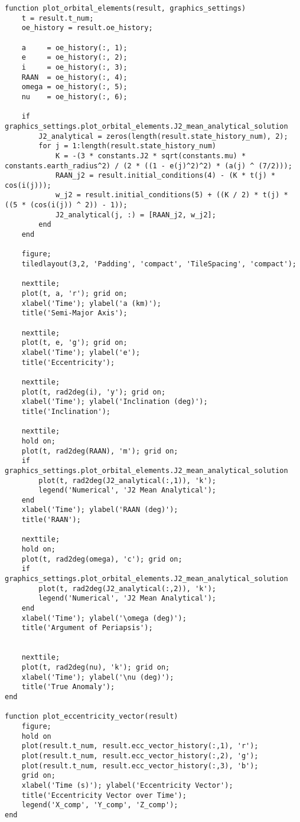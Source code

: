 \begin{lstlisting}
function plot_orbital_elements(result, graphics_settings)
    t = result.t_num;
    oe_history = result.oe_history;

    a     = oe_history(:, 1);
    e     = oe_history(:, 2);
    i     = oe_history(:, 3);
    RAAN  = oe_history(:, 4);  
    omega = oe_history(:, 5);
    nu    = oe_history(:, 6);  

    if graphics_settings.plot_orbital_elements.J2_mean_analytical_solution
        J2_analytical = zeros(length(result.state_history_num), 2);
        for j = 1:length(result.state_history_num)
            K = -(3 * constants.J2 * sqrt(constants.mu) * constants.earth_radius^2) / (2 * ((1 - e(j)^2)^2) * (a(j) ^ (7/2)));
            RAAN_j2 = result.initial_conditions(4) - (K * t(j) * cos(i(j)));
            w_j2 = result.initial_conditions(5) + ((K / 2) * t(j) * ((5 * (cos(i(j)) ^ 2)) - 1));
            J2_analytical(j, :) = [RAAN_j2, w_j2];
        end
    end

    figure;
    tiledlayout(3,2, 'Padding', 'compact', 'TileSpacing', 'compact');

    nexttile;
    plot(t, a, 'r'); grid on;
    xlabel('Time'); ylabel('a (km)');
    title('Semi-Major Axis');

    nexttile;
    plot(t, e, 'g'); grid on;
    xlabel('Time'); ylabel('e');
    title('Eccentricity');

    nexttile;
    plot(t, rad2deg(i), 'y'); grid on;
    xlabel('Time'); ylabel('Inclination (deg)');
    title('Inclination');

    nexttile;
    hold on;
    plot(t, rad2deg(RAAN), 'm'); grid on;
    if graphics_settings.plot_orbital_elements.J2_mean_analytical_solution
        plot(t, rad2deg(J2_analytical(:,1)), 'k');
        legend('Numerical', 'J2 Mean Analytical');
    end
    xlabel('Time'); ylabel('RAAN (deg)');
    title('RAAN');

    nexttile;
    hold on;
    plot(t, rad2deg(omega), 'c'); grid on;
    if graphics_settings.plot_orbital_elements.J2_mean_analytical_solution
        plot(t, rad2deg(J2_analytical(:,2)), 'k');
        legend('Numerical', 'J2 Mean Analytical');
    end
    xlabel('Time'); ylabel('\omega (deg)');
    title('Argument of Periapsis');
    

    nexttile;
    plot(t, rad2deg(nu), 'k'); grid on;
    xlabel('Time'); ylabel('\nu (deg)');
    title('True Anomaly');
end

function plot_eccentricity_vector(result)
    figure;
    hold on
    plot(result.t_num, result.ecc_vector_history(:,1), 'r'); 
    plot(result.t_num, result.ecc_vector_history(:,2), 'g');
    plot(result.t_num, result.ecc_vector_history(:,3), 'b');
    grid on;
    xlabel('Time (s)'); ylabel('Eccentricity Vector');
    title('Eccentricity Vector over Time');
    legend('X_comp', 'Y_comp', 'Z_comp');
end


\end{lstlisting}
